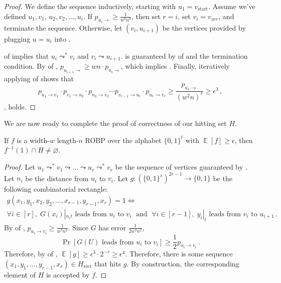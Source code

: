\documentclass{toc}
\DeclareMathOperator*{\ExpVal}{\mathbb{E}}
\begin{document}
\begin{proof}
We define the sequence inductively, starting with $u_1 = v_{\text{start}}$. Assume we've defined $u_1, v_1$, $u_2, v_2, \dots, u_i$. If $p_{u_i \to} \geq \frac{1}{w^3n^2}$, then set $r = i$, set $v_i = v_{\text{acc}}$, and terminate the sequence. Otherwise, let $(v_i, u_{i + 1})$ be the vertices provided by plugging $u = u_i$ into .

 of  implies that $u_i \leadsto^* v_i$ and $v_i \leadsto u_{i + 1}$.  is guaranteed by  of  and the termination condition. By  of , $p_{u_{i + 1} \to} \geq wn \cdot p_{u_i \to}$, which implies . Finally, iteratively applying  of  shows that
$$
p_{u_1 \to v_1} \cdot p_{v_1 \to u_2} \cdot p_{u_2 \to v_2} \cdots p_{v_{r - 1} \to u_r} \cdot p_{u_r \to v_r} \geq \frac{p_{u_1 \to}}{(w^2 n)^r} \geq \epsilon^3\,,
$$
\ie,  holds.
\end{proof}

We are now ready to complete the proof of correctness of our hitting set $H$.
\begin{claim}
If $f$ is a width-$w$ length-$n$ ROBP over the alphabet $\{0, 1\}^t$ with $\ExpVal[f] \geq \epsilon$, then $f^{-1}(1) \cap H \neq \varnothing$.
\end{claim}

\begin{proof}
Let $u_1 \leadsto^* v_1 \leadsto \dots \leadsto u_r \leadsto^* v_r$ be the sequence of vertices guaranteed by . Let $n_i$ be the distance from $u_i$ to $v_i$. Let $g \colon (\{0, 1\}^s)^{2r - 1} \to \{0, 1\}$ be the following combinatorial rectangle:
\begin{multline*}
g(x_1, y_1, x_2, y_2, \dots, x_{r - 1}, y_{r - 1}, x_r) = 1 \iff \\
\forall i \in [r], \; G(x_i)|_{n_i t} \text{ leads from } u_i \text{ to } v_i \; \text{ and } \; \forall i \in [r - 1], \; y_i|_t \text{ leads from } v_i \text{ to } u_{i + 1}\,.
\end{multline*}
By  of , $p_{u_i \to v_i} \geq \frac{1}{w^3 n^2}$. Since $G$ has error $\frac{1}{2w^3 n^2}$,
$$
\Pr[G(U) \text{ leads from } u_i \text{ to } v_i] \geq \frac{1}{2} p_{u_i \to v_i}\,.
$$
Therefore, by  of , $\ExpVal[g] \geq \epsilon^3 \cdot 2^{-r} \geq \epsilon^4$. Therefore, there is some sequence $(x_1, y_1, \dots, y_{r - 1}, x_r) \in H_{\text{rect}}$ that hits $g$. By construction, the corresponding element of $H$ is accepted by $f$.
\end{proof}
\end{document}
